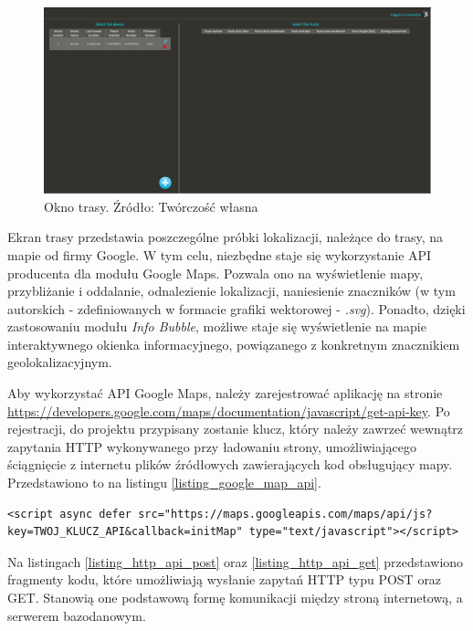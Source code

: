 \begin{figure}[H]
	\centering
	\includegraphics[width=18cm]{img/software/website/main_screen.png}
	\caption{Okno trasy. Źródło: Twórczość własna}
	\label{fig:image_soft_website_track_map}
\end{figure}

Ekran trasy przedstawia poszczególne próbki lokalizacji, należące do trasy, na mapie od firmy Google. W tym celu, niezbędne staje się wykorzystanie API producenta dla modułu Google Maps. Pozwala ono na wyświetlenie mapy, przybliżanie i oddalanie, odnalezienie lokalizacji, naniesienie znaczników (w tym autorskich - zdefiniowanych w formacie grafiki wektorowej - \textit{.svg}). Ponadto, dzięki zastosowaniu modułu \textit{Info Bubble}, możliwe staje się wyświetlenie na mapie interaktywnego okienka informacyjnego, powiązanego z konkretnym znacznikiem geolokalizacyjnym.

Aby wykorzystać API Google Maps, należy zarejestrować aplikację na stronie \url{https://developers.google.com/maps/documentation/javascript/get-api-key}. Po rejestracji, do projektu przypisany zostanie klucz, który należy zawrzeć wewnątrz zapytania HTTP wykonywanego przy ładowaniu strony, umożliwiającego ściągnięcie z internetu plików źródłowych zawierających kod obsługujący mapy. Przedstawiono to na listingu \ref{listing_google_map_api}.

\begin{lstlisting}[label=listing_google_map_api, caption=Fragment kodu pozwalający na użycie API Google Maps]
<script async defer src="https://maps.googleapis.com/maps/api/js?key=TWOJ_KLUCZ_API&callback=initMap" type="text/javascript"></script>
\end{lstlisting}

Na listingach \ref{listing_http_api_post} oraz \ref{listing_http_api_get} przedstawiono fragmenty kodu, które umożliwiają wysłanie zapytań HTTP typu POST oraz GET. Stanowią one podstawową formę komunikacji między stroną internetową, a serwerem bazodanowym.

